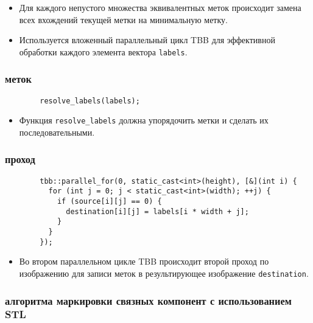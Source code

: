 \documentclass[a4paper, 14pt]{article}
\begin{document}
        
        \begin{itemize}
          \item Для каждого непустого множества эквивалентных меток происходит замена всех вхождений текущей метки на минимальную метку.
          \item Используется вложенный параллельный цикл TBB для эффективной обработки каждого элемента вектора \texttt{labels}.
        \end{itemize}
        
        \subsubsection*{ меток}
        
        \begin{verbatim}
        resolve_labels(labels);
        \end{verbatim}
        
        \begin{itemize}
          \item Функция \texttt{resolve\_labels} должна упорядочить метки и сделать их последовательными.
        \end{itemize}
        
        \subsubsection*{ проход}
        
        \begin{verbatim}
        tbb::parallel_for(0, static_cast<int>(height), [&](int i) {
          for (int j = 0; j < static_cast<int>(width); ++j) {
            if (source[i][j] == 0) {
              destination[i][j] = labels[i * width + j];
            }
          }
        });
        \end{verbatim}
        
        \begin{itemize}
          \item Во втором параллельном цикле TBB происходит второй проход по изображению для записи меток в результирующее изображение \texttt{destination}.
        \end{itemize}


        \newpage
        \subsubsection*{ алгоритма маркировки связных компонент с использованием STL}
\end{document}
